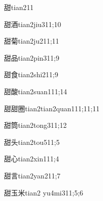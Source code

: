 \begin{verbete}{甜}{tian2}{11}
\end{verbete}

\begin{verbete}{甜酒}{tian2jiu3}{11;10}
\end{verbete}

\begin{verbete}{甜菊}{tian2ju2}{11;11}
\end{verbete}

\begin{verbete}{甜品}{tian2pin3}{11;9}
\end{verbete}

\begin{verbete}{甜食}{tian2shi2}{11;9}
\end{verbete}

\begin{verbete}{甜酸}{tian2suan1}{11;14}
\end{verbete}

\begin{verbete}{甜甜圈}{tian2tian2quan1}{11;11;11}
\end{verbete}

\begin{verbete}{甜筒}{tian2tong3}{11;12}
\end{verbete}

\begin{verbete}{甜头}{tian2tou5}{11;5}
\end{verbete}

\begin{verbete}{甜心}{tian2xin1}{11;4}
\end{verbete}

\begin{verbete}{甜言}{tian2yan2}{11;7}
\end{verbete}

\begin{verbete}{甜玉米}{tian2 yu4mi3}{11;5;6}
\end{verbete}

